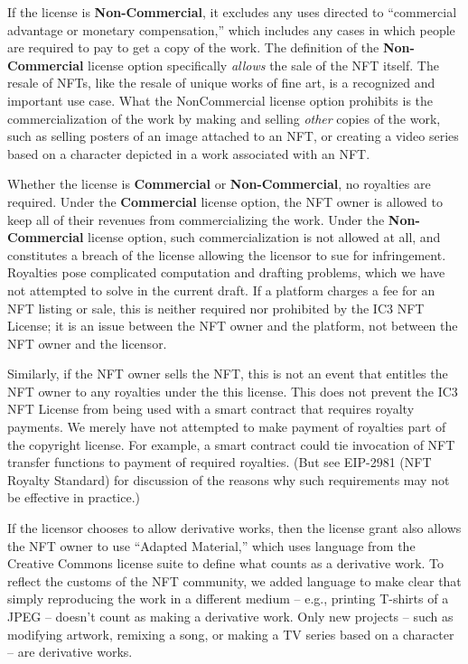 \documentclass{article}
\newcommand{\iccclicense}{IC3 NFT License\xspace}
\newcommand{\keyword}[1]{\textbf{#1}\xspace}
\newcommand{\commercial}{\keyword{Commercial}}
\newcommand{\noncommercial}{\keyword{Non-Commercial}}
\begin{document}
If the license is \noncommercial, it excludes any uses directed to ``commercial advantage or monetary compensation,'' which includes any cases in which people are required to pay to get a copy of the work.  The definition of the \noncommercial license option specifically \emph{allows} the sale of the NFT itself. The resale of NFTs, like the resale of unique works of fine art, is a recognized and important use case. What the NonCommercial license option prohibits is the commercialization of the work by making and selling \emph{other} copies of the work, such as selling posters of an image attached to an NFT, or creating a video series based on a character depicted in a work associated with an NFT.

Whether the license is \commercial or \noncommercial, no royalties are required. Under the \commercial license option, the NFT owner is allowed to keep all of their revenues from commercializing the work. Under the \noncommercial license option, such commercialization is not allowed at all, and constitutes a breach of the license allowing the licensor to sue for infringement. Royalties pose complicated computation and drafting problems, which we have not attempted to solve in the current draft. If a platform charges a fee for an NFT listing or sale, this is neither required nor prohibited by the \iccclicense; it is an issue between the NFT owner and the platform, not between the NFT owner and the licensor.  

Similarly, if the NFT owner sells the NFT, this is not an event that entitles the NFT owner to any royalties under the this license.  This does not prevent the \iccclicense from being used with a smart contract that requires royalty payments. We merely have not attempted to make payment of royalties part of the copyright license. For example, a smart contract could tie invocation of NFT transfer functions to payment of required royalties. (But see EIP-2981 (NFT Royalty Standard) for discussion of the reasons why such requirements may not  be effective in practice.) 

If the licensor chooses to allow derivative works, then the license grant also allows the NFT owner to use ``Adapted Material,'' which uses language from the Creative Commons license suite to define what counts as a derivative work. To reflect the customs of the NFT community, we added language to make clear that simply reproducing the work in a different medium -- e.g., printing T-shirts of a JPEG -- doesn't count as making a derivative work. Only new projects -- such as modifying artwork, remixing a song, or making a TV series based on a character -- are derivative works.
\end{document}
